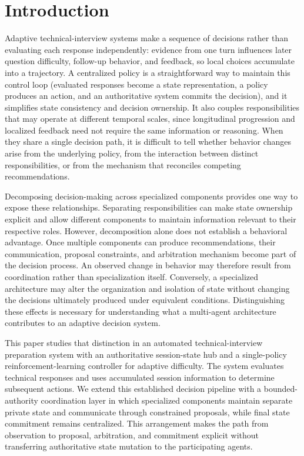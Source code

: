 \documentclass[runningheads]{llncs}
\begin{document}
\section{Introduction}

Adaptive technical-interview systems make a sequence of decisions rather than evaluating each response independently: evidence from one turn influences later question difficulty, follow-up behavior, and feedback, so local choices accumulate into a trajectory. A centralized policy is a straightforward way to maintain this control loop (evaluated responses become a state representation, a policy produces an action, and an authoritative system commits the decision), and it simplifies state consistency and decision ownership. It also couples responsibilities that may operate at different temporal scales, since longitudinal progression and localized feedback need not require the same information or reasoning. When they share a single decision path, it is difficult to tell whether behavior changes arise from the underlying policy, from the interaction between distinct responsibilities, or from the mechanism that reconciles competing recommendations.

Decomposing decision-making across specialized components provides one way to expose these relationships. Separating responsibilities can make state ownership explicit and allow different components to maintain information relevant to their respective roles. However, decomposition alone does not establish a behavioral advantage. Once multiple components can produce recommendations, their communication, proposal constraints, and arbitration mechanism become part of the decision process. An observed change in behavior may therefore result from coordination rather than specialization itself. Conversely, a specialized architecture may alter the organization and isolation of state without changing the decisions ultimately produced under equivalent conditions. Distinguishing these effects is necessary for understanding what a multi-agent architecture contributes to an adaptive decision system.

This paper studies that distinction in an automated technical-interview preparation system with an authoritative session-state hub and a single-policy reinforcement-learning controller for adaptive difficulty. The system evaluates technical responses and uses accumulated session information to determine subsequent actions. We extend this established decision pipeline with a bounded-authority coordination layer in which specialized components maintain separate private state and communicate through constrained proposals, while final state commitment remains centralized. This arrangement makes the path from observation to proposal, arbitration, and commitment explicit without transferring authoritative state mutation to the participating agents.
\end{document}
